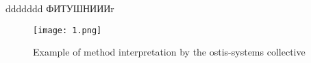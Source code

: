 
ddddddd
ФИТУШНИИИr
\usepackage{multicol}
\usepackage{amsmath}
\usepackage{amssymb}
\usepackage[left=20mm, top=17mm, right=16mm, bottom=18mm, ]{geometry}
\usepackage{enumitem}
\usepackage{fancyhdr}
\usepackage[russian]{babel}
\setlength{\columnsep}{0.5cm}
\graphicspath{{files/}}
\pagestyle{fancy}
\fancyhf{}
\renewcommand{\headrulewidth}{0pt}
\fancyfoot[C]{\textbf{\thepage}}

\setcounter{page}{27}
\usepackage{setspace}
\linespread{0.3}


\setcounter{figure}{2}

\begin{figure}
    \centering
   
\texttt{[image: 1.png]}

    \caption{ Example of method interpretation by the ostis-systems collective}
    
  
    \end{figure}
\setlength{\parskip}{0pt}%
